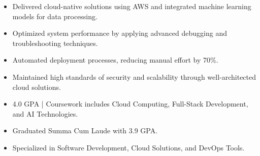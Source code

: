\par\smallskip
\noindent
\begin{minipage}{20cm}
  \begin{minipage}{9.75cm}
    \begin{itemize}
      \item Delivered cloud-native solutions using AWS and integrated machine learning models for data processing.
      \item Optimized system performance by applying advanced debugging and troubleshooting techniques.
    \end{itemize}
  \end{minipage}
  \hfill
  \begin{minipage}{9.75cm}
    \begin{itemize}
      \item Automated deployment processes, reducing manual effort by 70\%.
      \item Maintained high standards of security and scalability through well-architected cloud solutions.
    \end{itemize}
  \end{minipage}
\end{minipage}
\par\smallskip
\divider

\begin{itemize}
  \item 4.0 GPA | Coursework includes Cloud Computing, Full-Stack Development, and AI Technologies.
\end{itemize}
\divider

\begin{itemize}
  \item Graduated Summa Cum Laude with 3.9 GPA.
  \item Specialized in Software Development, Cloud Solutions, and DevOps Tools.
\end{itemize}

\noindent
\begin{minipage}{20cm}
\end{minipage}


